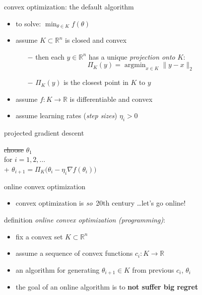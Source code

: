 \documentclass[xcolor={svgnames},
               hyperref={colorlinks,citecolor=DeepPink4,linkcolor=FireBrick,urlcolor=Maroon}]
               {beamer}
\newcommand{\grad}{\nabla}
\newcommand{\argmin}{\operatorname{argmin}}
\newcommand{\RR}{\mathbb{R}}
\newcommand{\ds}{\displaystyle}
\begin{document}
\begin{frame}{convex optimization: the default algorithm}

\begin{itemize}
\item to solve: \quad $\ds \min_{\theta \in K} f(\theta)$
\item assume $K\subset \RR^n$ is closed and convex
    \begin{itemize}
    \item[$-$] then each $y\in \RR^n$ has a unique \emph{projection onto } $K$:
    $$\Pi_K(y) = \argmin_{x\in K} \|y - x\|_2$$
    \item[$-$] $\Pi_K(y)$ is the closest point in $K$ to $y$
    \end{itemize}
\item assume $f:K\to \RR$ is differentiable and convex
\item assume learning rates (\emph{step sizes}) $\eta_i>0$
\end{itemize}

\begin{block}{projected gradient descent}

\begin{pseudo*}
\st{choose} $\theta_1$ \\
for $i = 1,2,\dots$ \\+
    $\theta_{i+1} = \Pi_K \big(\theta_i - \eta_i \grad f(\theta_i)\big)$
\end{pseudo*}
\end{block}
\end{frame}


\begin{frame}{online convex optimization}

\begin{itemize}
\item convex optimization is \emph{so}\, 20th century \dots let's go online!
\end{itemize}

\begin{block}{definition}
\emph{online convex optimization (programming)}:

\begin{itemize}
\item fix a convex set $K\subset \RR^n$
\item assume a sequence of convex functions $c_i:K\to \RR$
\item an algorithm for generating $\theta_{i+1} \in K$ from previous $c_i$, $\theta_i$
\end{itemize}
\end{block}

\bigskip
\begin{itemize}
\item the goal of an online algorithm is to \textbf{not suffer big regret}
\end{itemize}
\end{frame}
\end{document}
